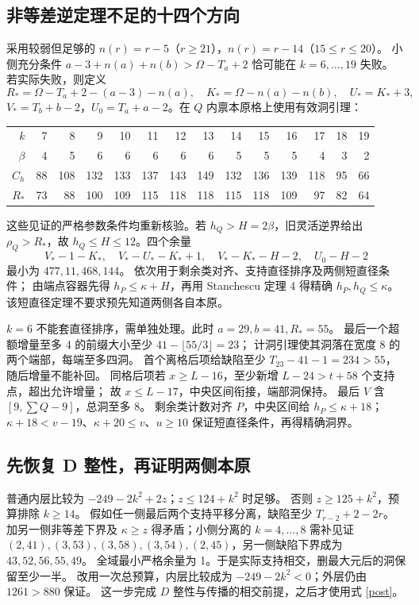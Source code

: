 \documentclass[11pt,a4paper]{article}
\theoremstyle{definition}
\begin{document}
\subsection{非等差逆定理不足的十四个方向}
采用较弱但足够的 $n(r)=r-5$（$r\ge21$），$n(r)=r-14$（$15\le r\le20$）。
小侧充分条件 $a-3+n(a)+n(b)>\Omega-T_a+2$ 恰可能在 $k=6,\ldots,19$ 失败。
若实际失败，则定义
\[
 R_* =\Omega-T_a+2-(a-3)-n(a),\quad
 K_* =\Omega-n(a)-n(b),\quad U_* =K_*+3,
\]
$V_*=T_b+b-2$，$U_0=T_a+a-2$。在 $Q$ 内禀本原格上使用有效洞引理：
\begin{center}\small\begin{tabular}{r|rrrrrrrrrrrrr}\toprule
$k$&7&8&9&10&11&12&13&14&15&16&17&18&19\\
$\beta$&4&5&6&6&6&6&6&5&5&5&4&3&2\\
$C_h$&88&108&132&133&137&143&149&132&136&139&118&95&66\\
$R_*$&73&88&100&109&115&118&118&115&118&109&97&82&64\\\bottomrule
\end{tabular}\end{center}
这些见证的严格参数条件均重新核验。若 $h_Q>H=2\beta$，旧灵活逆界给出
$\rho_Q>R_*$，故 $h_Q\le H\le12$。四个余量
\[
 V_*-1-K_*,\quad V_*-U_*-K_*+1,\quad
 V_*-K_*-H-2,\quad U_0-H-2
\]
最小为 $477,11,468,144$。
依次用于剩余类对齐、支持直径排序及两侧短直径条件；
由端点容器先得 $h_P\le\kappa+H$，再用 Stanchescu 定理 4 得精确 $h_P,h_Q\le\kappa$。
该短直径定理不要求预先知道两侧各自本原。

$k=6$ 不能套直径排序，需单独处理。此时 $a=29,b=41,R_*=55$。
最后一个超额增量至多 4 的前缀大小至少 $41-\lfloor55/3\rfloor=23$；
计洞引理使其洞落在宽度 8 的两个端部，每端至多四洞。
首个离格后项给缺陷至少 $T_{23}-41-1=234>55$，随后增量不能补回。
同格后项若 $x\ge L-16$，至少新增 $L-24>t+58$ 个支持点，超出允许增量；
故 $x\le L-17$，中央区间衔接，端部洞保持。
最后 $V$ 含 $[9,\sum Q-9]$，总洞至多 8。
剩余类计数对齐 $P$，中央区间给 $h_P\le\kappa+18$；
$\kappa+18<v-19$、$\kappa+20\le v$、$u\ge10$ 保证短直径条件，再得精确洞界。

\subsection{先恢复 D 整性，再证明两侧本原}
普通内层比较为 $-249-2k^2+2z$；$z\le124+k^2$ 时足够。
否则 $z\ge125+k^2$，预算排除 $k\ge14$。
假如任一侧最后两个支持平移分离，缺陷至少 $T_{r-2}+2-2r$。
加另一侧非等差下界及 $\kappa\ge z$ 得矛盾；小侧分离的 $k=4,\ldots,8$ 需补见证
$(2,41),(3,53),(3,58),(3,54),(2,45)$，另一侧缺陷下界成为 $43,52,56,55,49$。
全域最小严格余量为 1。于是实际支持相交，删最大元后的洞保留至少一半。
改用一次总预算，内层比较成为 $-249-2k^2<0$；外层仍由 $1261>880$ 保证。
这一步完成 $D$ 整性与传播的相交前提，之后才使用式 \eqref{post}。
\end{document}
